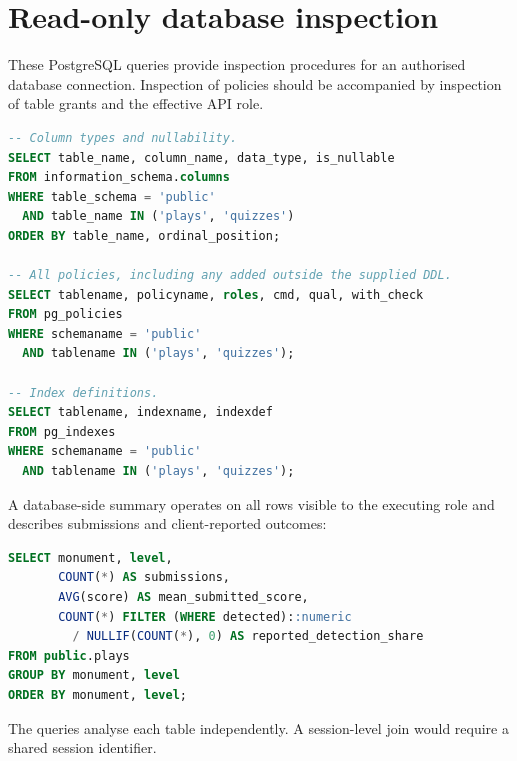 \documentclass[10pt,a4paper]{article}
\begin{document}
\section{Read-only database inspection}\label{app:sql}
These PostgreSQL queries provide inspection procedures for an authorised database connection. Inspection of policies should be accompanied by inspection of table grants and the effective API role.
\begin{lstlisting}[language=SQL]
-- Column types and nullability.
SELECT table_name, column_name, data_type, is_nullable
FROM information_schema.columns
WHERE table_schema = 'public'
  AND table_name IN ('plays', 'quizzes')
ORDER BY table_name, ordinal_position;

-- All policies, including any added outside the supplied DDL.
SELECT tablename, policyname, roles, cmd, qual, with_check
FROM pg_policies
WHERE schemaname = 'public'
  AND tablename IN ('plays', 'quizzes');

-- Index definitions.
SELECT tablename, indexname, indexdef
FROM pg_indexes
WHERE schemaname = 'public'
  AND tablename IN ('plays', 'quizzes');
\end{lstlisting}
A database-side summary operates on all rows visible to the executing role and describes submissions and client-reported outcomes:
\begin{lstlisting}[language=SQL]
SELECT monument, level,
       COUNT(*) AS submissions,
       AVG(score) AS mean_submitted_score,
       COUNT(*) FILTER (WHERE detected)::numeric
         / NULLIF(COUNT(*), 0) AS reported_detection_share
FROM public.plays
GROUP BY monument, level
ORDER BY monument, level;
\end{lstlisting}
The queries analyse each table independently. A session-level join would require a shared session identifier.
\end{document}

